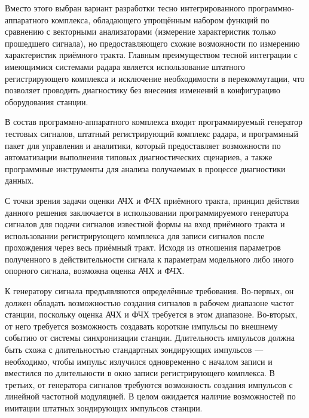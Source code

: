 \documentclass{report}
\begin{document}
Вместо этого выбран вариант разработки тесно интегрированного программно-аппаратного комплекса, обладающего упрощённым набором функций по сравнению с векторными анализаторами (измерение характеристик только прошедшего сигнала), но предоставляющего схожие возможности по измерению характеристик приёмного тракта. Главным преимуществом тесной интеграции с имеющимися системами радара является использование штатного регистрирующего комплекса и исключение необходимости в перекоммутации, что позволяет проводить диагностику без внесения изменений в конфигурацию оборудования станции.

В состав программно-аппаратного комплекса входит программируемый генератор тестовых сигналов, штатный регистрирующий комплекс радара, и программный пакет для управления и аналитики, который предоставляет возможности по автоматизации выполнения типовых диагностических сценариев, а также программные инструменты для анализа получаемых в процессе диагностики данных.

С точки зрения задачи оценки АЧХ и ФЧХ приёмного тракта, принцип действия данного решения заключается в использовании программируемого генератора сигналов для подачи сигналов известной формы на вход приёмного тракта и использовании регистрирующего комплекса для записи сигналов после прохождения через весь приёмный тракт. Исходя из отношения параметров полученного в действительности сигнала к параметрам модельного либо иного опорного сигнала, возможна оценка АЧХ и ФЧХ.

К генератору сигнала предъявляются определённые требования. Во-первых, он должен обладать возможностью создания сигналов в рабочем диапазоне частот станции, поскольку оценка АЧХ и ФЧХ требуется в этом диапазоне. Во-вторых, от него требуется возможность создавать короткие импульсы по внешнему событию от системы синхронизации станции. Длительность импульсов должна быть схожа с длительностью стандартных зондирующих импульсов --- необходимо, чтобы импульс излучился одновременно с началом записи и вместился по длительности в окно записи регистрирующего комплекса. В третьих, от генератора сигналов требуются возможность создания импульсов с линейной частотной модуляцией. В целом ожидается наличие возможностей по имитации штатных зондирующих импульсов станции.

\end{document}
